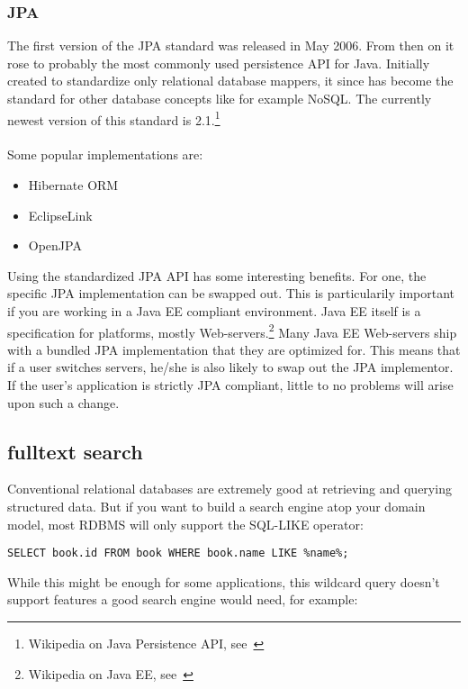 \subsubsection{JPA}

The first version of the JPA standard was released in May 2006. From then on it rose to probably the most commonly used persistence API for Java. Initially created to standardize only relational database mappers, it since has become the standard for other database concepts like for example NoSQL. The currently newest version of this standard is 2.1.\footnote{Wikipedia on Java Persistence API, see~\cite{wiki_jpa}}
\\\\
Some popular implementations are:
\begin{itemize}
	\item Hibernate ORM
	\item EclipseLink
	\item OpenJPA
\end{itemize}
Using the standardized JPA API has some interesting benefits. For one, the specific JPA implementation can be swapped out. This is particularily important if you are working in a Java EE compliant environment. Java EE itself is a specification for platforms, mostly Web-servers.\footnote{Wikipedia on Java EE, see~\cite{wiki_java_ee}} Many Java EE Web-servers ship with a bundled JPA implementation that they are optimized for. This means that if a user switches servers, he/she is also likely to swap out the JPA implementor. If the user's application is strictly JPA compliant, little to no problems will arise upon such a change.

\subsection{fulltext search}

Conventional relational databases are extremely good at retrieving and querying structured data. But if you want to build a search engine atop your domain model, most RDBMS will only support the SQL-LIKE operator:\\

\lstset{language=sql}
\begin{lstlisting}[frame=htrbl, label={lst:result2}]
SELECT book.id FROM book WHERE book.name LIKE %name%;
\end{lstlisting}
While this might be enough for some applications, this wildcard query doesn't support features a good search engine would need, for example:

